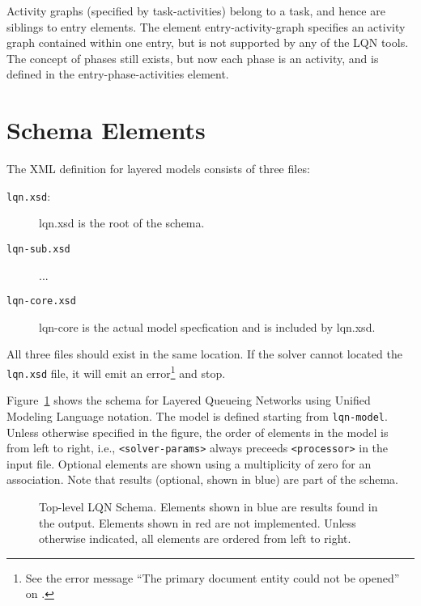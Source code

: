 Activity graphs (specified by task-activities) belong to a task, and
hence are siblings to entry elements.  The element
entry-activity-graph specifies an activity graph contained within one
entry, but is not supported by any of the LQN tools.  The concept of
phases still exists, but now each phase is an activity, and is defined
in the entry-phase-activities element.

\section{Schema Elements}
\label{sec:schema-elements}

The XML definition for layered models consists of three files:
\begin{description}
\item[\texttt{lqn.xsd}:] lqn.xsd is the root of the schema.
\item[\texttt{lqn-sub.xsd}] ...
\item[\texttt{lqn-core.xsd}] lqn-core is the
  actual model specfication and is included by lqn.xsd.
\end{description}
All three files should exist in the same location.  If the solver cannot located the \texttt{lqn.xsd} file,
it will emit an error\footnote{See the error message ``The primary document entity could not be opened'' on
  \pageref{error:primary-document}.} and stop.

Figure~\ref{fig:Schema} shows the schema for Layered Queueing Networks
using Unified Modeling Language notation.  The model is defined starting from
\texttt{lqn-model}.  Unless otherwise specified in the figure, the order of
elements in the model is from left to right, i.e., \texttt{<solver-params>}
always preceeds \texttt{<processor>} in the input file.  Optional elements are
shown using a multiplicity of zero for an association.  Note that results
(optional, shown in blue) are part of the schema.

\begin{figure}[htbp]
  \caption{Top-level LQN Schema.  Elements shown in \color{blue}blue\color{black}\mbox{} are results found in the output.
    Elements shown in \color{red}red\color{black}\mbox{} are not implemented.  Unless otherwise indicated, all elements are
    ordered from left to right.}
  \label{fig:Schema}
\end{figure}


